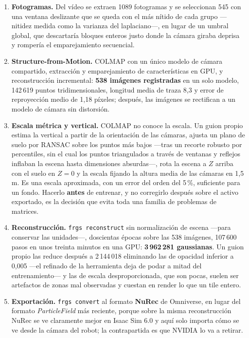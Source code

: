 \begin{enumerate}
	\item \textbf{Fotogramas.} Del vídeo se extraen 1089 fotogramas y se seleccionan 545 con una
	ventana deslizante que se queda con el más nítido de cada grupo —nitidez medida como la
	varianza del laplaciano—, en lugar de un umbral global, que descartaría bloques enteros justo
	donde la cámara giraba deprisa y rompería el emparejamiento secuencial.
	\item \textbf{Structure-from-Motion.} COLMAP con un único modelo de cámara compartido,
	extracción y emparejamiento de características en GPU, y reconstrucción incremental:
	\textbf{538 imágenes registradas} en un solo modelo, 142\,619 puntos tridimensionales, longitud
	media de traza 8,3 y error de reproyección medio de 1,18 píxeles; después, las imágenes se
	rectifican a un modelo de cámara sin distorsión.
	\item \textbf{Escala métrica y vertical.} COLMAP no conoce la escala. Un guion propio estima la
	vertical a partir de la orientación de las cámaras, ajusta un plano de suelo por RANSAC sobre
	los puntos más bajos —tras un recorte robusto por percentiles, sin el cual los puntos
	triangulados a través de ventanas y reflejos inflaban la escena hasta dimensiones absurdas—,
	rota la escena a $Z$ arriba con el suelo en $Z = 0$ y la escala fijando la altura media de las
	cámaras en 1,5\,m. Es una escala aproximada, con un error del orden del 5\,\%, suficiente para
	un fondo. Hacerlo \textbf{antes} de entrenar, y no corregirlo después sobre el activo
	exportado, es la decisión que evita toda una familia de problemas de matrices.
	\item \textbf{Reconstrucción.} \texttt{frgs reconstruct} sin normalización de escena —para
	conservar las unidades—, doscientas épocas sobre las 538 imágenes, 107\,600 pasos en unos
	treinta minutos en una GPU: \textbf{3\,962\,281 gaussianas}. Un guion propio las reduce después
	a 2\,144\,018 eliminando las de opacidad inferior a 0,005 —el refinado de la herramienta deja
	de podar a mitad del entrenamiento— y las de escala desproporcionada, que son pocas, suelen
	ser artefactos de zonas mal observadas y cuestan en render lo que un tile entero.
	\item \textbf{Exportación.} \texttt{frgs convert} al formato \textbf{NuRec} de Omniverse, en
	lugar del formato \textit{ParticleField} más reciente, porque sobre la misma reconstrucción
	NuRec se ve claramente mejor en Isaac Sim 6.0 y aquí solo importa cómo se ve desde la cámara
	del robot; la contrapartida es que NVIDIA lo va a retirar.

\end{enumerate}
